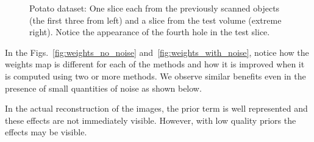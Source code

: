 \documentclass{article}
\begin{document}
\begin{figure}[!h]
\begin{subfigure}[b]{0.235\linewidth}
\captionsetup{labelformat=empty}
        \caption{}
\label{fig:potato_test}
     \end{subfigure}
      \caption{Potato dataset: One slice each from the previously scanned objects (the first three from left) and a slice from the test 
        volume (extreme right). Notice the appearance of the fourth
        hole in the test slice. }
\label{fig:object-prior_test_potato_A1}
\end{figure}


In the Figs.~\ref{fig:weights_no_noise} and~\ref{fig:weights_with_noise}, notice how the weights map is different for each of the methods and how it is improved when it is computed using two or more methods. We observe similar benefits even in the presence of small quantities of noise as shown below. 

In the actual reconstruction of the images, the prior term is well represented and these effects are not immediately visible.  However, with low quality priors the effects may be visible.
\end{document}
